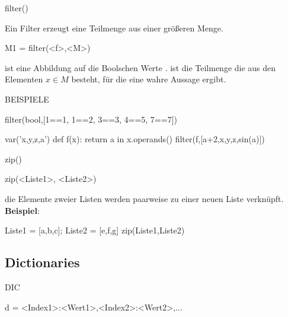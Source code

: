 \documentclass[fontsize=12pt,paper=a4,twoside,bibtotoc,idxtotoc,
liststotoc,pagesize,BCOR1.2cm,DIV15,chapterprefix,pagesize=pdftex]{scrbook}
\theoremstyle{plain}
\theoremstyle{definition}
\theoremstyle{remark}
\begin{document}
filter()

Ein Filter erzeugt eine Teilmenge aus einer größeren Menge.
\begin{sagein}
M1 = filter(<f>,<M>)
\end{sagein}

  ist eine Abbildung auf die Boolschen Werte . 
  ist die Teilmenge  die aus den Elementen $x\in M$ besteht, für die  eine wahre Aussage
ergibt. 


BEISPIELE

\begin{sagein}
 filter(bool,[1==1, 1==2, 3==3, 4==5, 7==7])
 \end{sagein}
 \begin{sage}
 \end{sage}
\begin{sagein}
var('x,y,z,a')
def f(x): return a in x.operands()
filter(f,[a+2,x,y,z,sin(a)])
\end{sagein}
\begin{sage}
  [a + 2, sin(a)]
\end{sage}

zip()

\begin{sagein}
zip(<Liste1>, <Liste2>) 
\end{sagein}
die Elemente zweier Listen werden paarweise zu einer neuen Liste verknüpft.\\
\textbf{Beispiel}:
\begin{sagein}
Liste1 = [a,b,c]; Liste2 = [e,f,g]
zip(Liste1,Liste2)
\end{sagein}
\begin{sage}
[(a, e), (b, f), (c, g)]
\end{sage}

\subsection{Dictionaries}
DIC

\begin{sagein}
d = {<Index1>:<Wert1>,<Index2>:<Wert2>,...}
\end{sagein}
\end{document}
